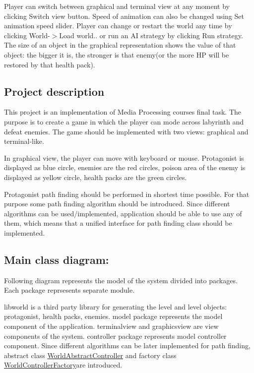 Player can switch between graphical and terminal view at any moment by clicking {\ttfamily Switch view} button. Speed of animation can also be changed using {\ttfamily Set animation speed} slider. Player can change or restart the world any time by clicking {\ttfamily World-\/$>$Load world..} or run an AI strategy by clicking {\ttfamily Run strategy}. The size of an object in the graphical representation shows the value of that object\+: the bigger it is, the stronger is that enemy(or the more HP will be restored by that health pack).

\subsection*{Project description}

This project is an implementation of Media Processing course\textquotesingle{}s final task. The purpose is to create a game in which the player can mode across labyrinth and defeat enemies. The game should be implemented with two views\+: graphical and terminal-\/like.

In graphical view, the player can move with keyboard or mouse. Protagonist is displayed as blue circle, enemies are the red circles, poison area of the enemy is displayed as yellow circle, health packs are the green circles.

Protagonist path finding should be performed in shortest time possible. For that purpose some path finding algorithm should be introduced. Since different algorithms can be used/implemented, application should be able to use any of them, which means that a unified interface for path finding class should be implemented.

\subsection*{Main class diagram\+:}

Following diagram represents the model of the system divided into packages. Each package reprsesents separate module.



{\ttfamily libworld} is a third party library for generating the level and level objects\+: protagonist, health packs, enemies. {\ttfamily model} package represents the model component of the application. {\ttfamily terminalview} and {\ttfamily graphicsview} are view components of the system. {\ttfamily controller} package represents model controller component. Since different algorithms can be later implemented for path finding, abstract class {\ttfamily \hyperlink{classWorldAbstractController}{World\+Abstract\+Controller}} and factory class {\ttfamily \hyperlink{classWorldControllerFactory}{World\+Controller\+Factory}}are introduced.

